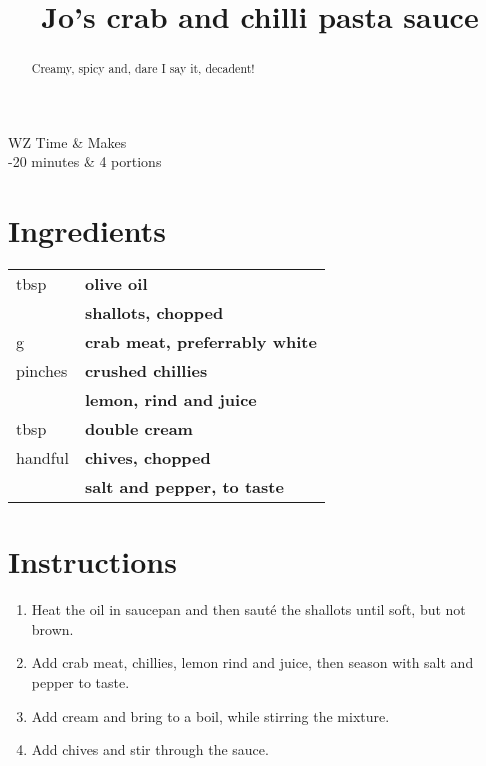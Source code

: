 \documentclass[main.tex]{subfiles}
\title{Jo's crab and chilli pasta sauce}
\begin{document}
\maketitle%

\begin{margintable}
\begin{tabularx}{\textwidth}{WZ}
Time & Makes\\ 
-20 minutes & 4 portions\\
\end{tabularx}
\end{margintable}

\begin{abstract}
Creamy, spicy and, dare I say it, decadent!
\end{abstract}

\section{Ingredients}

\vspace*{-\baselineskip}
\begin{table}[ht]
	\begin{tabularx}{\textwidth}{>{\hsize=0.333\hsize}X>{\bf\hsize=1\hsize}X}
	\unit[2]{tbsp} & olive oil\\
	\unit[2]{} & shallots, chopped\\
	\unit[200]{g} & crab meat, preferrably white\\
	\unit[1--2]{pinches} & crushed chillies\\
	\unit[1]{} & lemon, rind and juice\\
	\unit[4]{tbsp} & double cream \\
	\unit[1]{handful} & chives, chopped \\
    \unit[]{} & salt and pepper, to taste
	\end{tabularx}
\end{table}

\section{Instructions}

\begin{enumerate}	
	\item Heat the oil in saucepan and then saut\'{e} the shallots until soft, but not brown.
	
	\item Add crab meat, chillies, lemon rind and juice, then season with salt and pepper to taste.
	
	\item Add cream and bring to a boil, while stirring the mixture.
	
	\item Add chives and stir through the sauce.
	
\end{enumerate}

\end{document}
